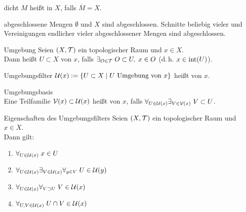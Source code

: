\begin{Def}{dicht}
    $M$ heißt  in $X$, falls $\overline{M} = X$.
\end{Def}

\begin{Satz}{abgeschlossene Mengen}
    $\emptyset$ und $X$ sind abgeschlossen.
    Schnitte beliebig vieler und Vereinigungen endlicher vieler abgeschlossener Mengen sind
    abgeschlossen.
\end{Satz}

\linie

\begin{Def}{Umgebung}
    Seien $(X, \mathcal{T})$ ein topologischer Raum und $x \in X$.\\
    Dann heißt $U \subset X$  von $x$, falls
    $\exists_{O \in \mathcal{T}}\; O \subset U,\; x \in O$
    (d.\,h. $x \in \operatorname{int}(U)$).
\end{Def}

\begin{Def}{Umgebungsfilter}
    $\mathcal{U}(x) := \{U \subset X \;|\; U \text{ Umgebung von } x\}$ heißt
     von $x$.
\end{Def}

\begin{Def}{Umgebungsbasis}\\
    Eine Teilfamilie $\mathcal{V}(x) \subset \mathcal{U}(x)$ heißt  von $x$, falls
    $\forall_{U \in \mathcal{U}(x)} \exists_{V \in \mathcal{V}(x)}\; V \subset U$.
\end{Def}

\begin{Satz}{Eigenschaften des Umgebungsfilters}
    Seien $(X, \mathcal{T})$ ein topologischer Raum und $x \in X$.\\
    Dann gilt:
    \begin{enumerate}
        \item
        $\forall_{U \in \mathcal{U}(x)}\; x \in U$

        \item
        $\forall_{U \in \mathcal{U}(x)} \exists_{V \in \mathcal{U}(x)} \forall_{y \in V}\; U \in \mathcal{U}(y)$

        \item
        $\forall_{U \in \mathcal{U}(x)} \forall_{V \supset U}\; V \in \mathcal{U}(x)$

        \item
        $\forall_{U, V \in \mathcal{U}(x)}\; U \cap V \in \mathcal{U}(x)$
    \end{enumerate}
\end{Satz}

